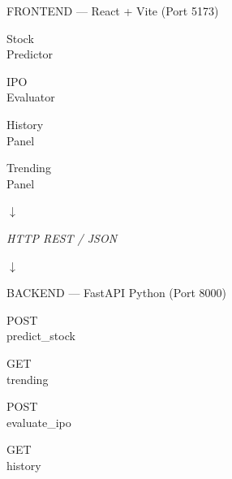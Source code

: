 \documentclass{article}
\newcommand{\bodyfont}{\fontsize{20}{24}\selectfont}
\newcommand{\smallfont}{\fontsize{18}{22}\selectfont}
\newcommand{\farrow}{%
  \par\vspace{2pt}%
  \begin{center}\color{bwacc}\Large$\downarrow$\end{center}%
  \vspace{2pt}}
\newcommand{\flabel}[1]{%
  \begin{center}\itshape\smallfont\color{gray}#1\end{center}}
\begin{document}
\begin{minipage}[t]{0.315\linewidth}
\begin{tcolorbox}[sbox, title={[5] System Architecture}]
\bodyfont
\begin{tcolorbox}[flblue]FRONTEND --- React + Vite (Port 5173)\end{tcolorbox}
\vspace{3pt}
\noindent
\begin{minipage}[t]{0.24\linewidth}
  \begin{tcolorbox}[chipb]Stock\\Predictor\end{tcolorbox}
\end{minipage}\hfill
\begin{minipage}[t]{0.24\linewidth}
  \begin{tcolorbox}[chipb]IPO\\Evaluator\end{tcolorbox}
\end{minipage}\hfill
\begin{minipage}[t]{0.24\linewidth}
  \begin{tcolorbox}[chipb]History\\Panel\end{tcolorbox}
\end{minipage}\hfill
\begin{minipage}[t]{0.24\linewidth}
  \begin{tcolorbox}[chipb]Trending\\Panel\end{tcolorbox}
\end{minipage}

\farrow\flabel{HTTP REST / JSON}\farrow

\begin{tcolorbox}[flpurple]BACKEND --- FastAPI Python (Port 8000)\end{tcolorbox}
\vspace{3pt}
\noindent
\begin{minipage}[t]{0.24\linewidth}
  \begin{tcolorbox}[chipp]POST\\predict\_stock\end{tcolorbox}
\end{minipage}\hfill
\begin{minipage}[t]{0.24\linewidth}
  \begin{tcolorbox}[chipp]GET\\trending\end{tcolorbox}
\end{minipage}\hfill
\begin{minipage}[t]{0.24\linewidth}
  \begin{tcolorbox}[chipp]POST\\evaluate\_ipo\end{tcolorbox}
\end{minipage}\hfill
\begin{minipage}[t]{0.24\linewidth}
  \begin{tcolorbox}[chipp]GET\\history\end{tcolorbox}
\end{minipage}


\end{tcolorbox}
\end{minipage}
\end{document}
